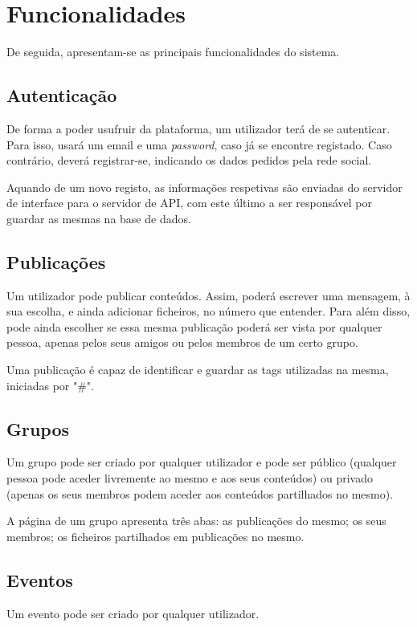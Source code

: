 \documentclass[a4paper]{report}
\begin{document}
	\section{Funcionalidades}
    De seguida, apresentam-se as principais funcionalidades do sistema.
	
	\subsection{Autenticação}
    De forma a poder usufruir da plataforma, um utilizador terá de se autenticar. Para isso, usará um email e uma \textit{password}, caso já se encontre registado.
    Caso contrário, deverá registrar-se, indicando os dados pedidos pela rede social.

    Aquando de um novo registo, as informações respetivas são enviadas do servidor de interface para o servidor de API, com este último a ser responsável por guardar as mesmas na base de dados.


	\subsection{Publicações}
    Um utilizador pode publicar conteúdos. Assim, poderá escrever uma mensagem, à sua escolha, e ainda adicionar ficheiros, no número que entender. 
    Para além disso, pode ainda escolher se essa mesma publicação poderá ser vista por qualquer pessoa, apenas pelos seus amigos ou pelos membros de um certo grupo.

    Uma publicação é capaz de identificar e guardar as tags utilizadas na mesma, iniciadas por "#".


    \subsection{Grupos}
    Um grupo pode ser criado por qualquer utilizador e pode ser público (qualquer pessoa pode aceder livremente ao mesmo e aos seus conteúdos) ou privado (apenas os seus membros podem aceder aos conteúdos partilhados no mesmo).

    A página de um grupo apresenta três abas: as publicações do mesmo; os seus membros; os ficheiros partilhados em publicações no mesmo.


    \subsection{Eventos}
    Um evento pode ser criado por qualquer utilizador.
\end{document}
